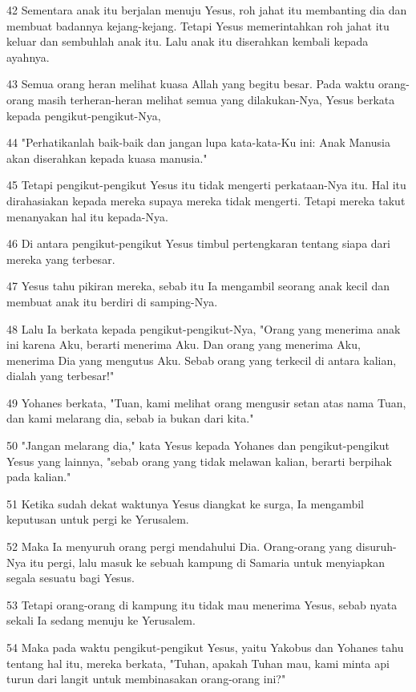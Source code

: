 \par 42 Sementara anak itu berjalan menuju Yesus, roh jahat itu membanting dia dan membuat badannya kejang-kejang. Tetapi Yesus memerintahkan roh jahat itu keluar dan sembuhlah anak itu. Lalu anak itu diserahkan kembali kepada ayahnya.
\par 43 Semua orang heran melihat kuasa Allah yang begitu besar. Pada waktu orang-orang masih terheran-heran melihat semua yang dilakukan-Nya, Yesus berkata kepada pengikut-pengikut-Nya,
\par 44 "Perhatikanlah baik-baik dan jangan lupa kata-kata-Ku ini: Anak Manusia akan diserahkan kepada kuasa manusia."
\par 45 Tetapi pengikut-pengikut Yesus itu tidak mengerti perkataan-Nya itu. Hal itu dirahasiakan kepada mereka supaya mereka tidak mengerti. Tetapi mereka takut menanyakan hal itu kepada-Nya.
\par 46 Di antara pengikut-pengikut Yesus timbul pertengkaran tentang siapa dari mereka yang terbesar.
\par 47 Yesus tahu pikiran mereka, sebab itu Ia mengambil seorang anak kecil dan membuat anak itu berdiri di samping-Nya.
\par 48 Lalu Ia berkata kepada pengikut-pengikut-Nya, "Orang yang menerima anak ini karena Aku, berarti menerima Aku. Dan orang yang menerima Aku, menerima Dia yang mengutus Aku. Sebab orang yang terkecil di antara kalian, dialah yang terbesar!"
\par 49 Yohanes berkata, "Tuan, kami melihat orang mengusir setan atas nama Tuan, dan kami melarang dia, sebab ia bukan dari kita."
\par 50 "Jangan melarang dia," kata Yesus kepada Yohanes dan pengikut-pengikut Yesus yang lainnya, "sebab orang yang tidak melawan kalian, berarti berpihak pada kalian."
\par 51 Ketika sudah dekat waktunya Yesus diangkat ke surga, Ia mengambil keputusan untuk pergi ke Yerusalem.
\par 52 Maka Ia menyuruh orang pergi mendahului Dia. Orang-orang yang disuruh-Nya itu pergi, lalu masuk ke sebuah kampung di Samaria untuk menyiapkan segala sesuatu bagi Yesus.
\par 53 Tetapi orang-orang di kampung itu tidak mau menerima Yesus, sebab nyata sekali Ia sedang menuju ke Yerusalem.
\par 54 Maka pada waktu pengikut-pengikut Yesus, yaitu Yakobus dan Yohanes tahu tentang hal itu, mereka berkata, "Tuhan, apakah Tuhan mau, kami minta api turun dari langit untuk membinasakan orang-orang ini?"
